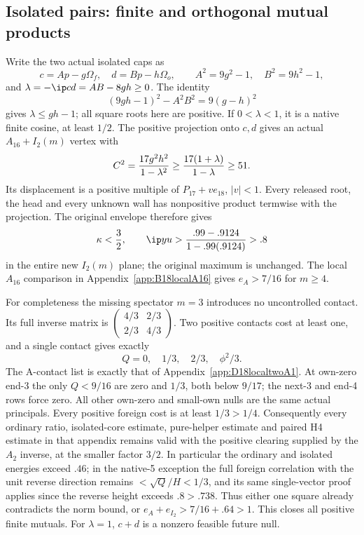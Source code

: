 \subsection{Isolated pairs: finite and orthogonal mutual products}
\label{app:D18isolatedfinite}

Write the two actual isolated caps as
\[
 c=Ap-g\Omega_f,\quad d=Bp-h\Omega_o,\qquad
 A^2=9g^2-1,\quad B^2=9h^2-1,
\]
and \(\lambda=-\ip cd=AB-8gh\ge0\).
The identity
\[
 (9gh-1)^2-A^2B^2=9(g-h)^2
\]
gives \(\lambda\le gh-1\); all square roots here are positive.
If \(0<\lambda<1\), it is a native finite cosine, at least \(1/2\).
The positive projection onto \(c,d\) gives an actual
\(A_{16}+I_2(m)\) vertex with
\[
 C^2={17g^2h^2\over1-\lambda^2}
 \ge {17(1+\lambda)\over1-\lambda}\ge51.
\]
Its displacement is a positive multiple of
\(P_{17}+ve_{18}\), \(|v|<1\).
Every released root, the head and every unknown wall has
nonpositive product termwise with the projection.
The original envelope therefore gives
\[
 \kappa<{3\over2},\qquad
 \ip yu>{.99-.9124\over1-.99(.9124)}>.8
\]
in the entire new \(I_2(m)\) plane; the original maximum is
unchanged.  The local \(A_{16}\) comparison in
Appendix~\ref{app:B18localA16} gives \(e_A>7/16\) for \(m\ge4\).

For completeness the missing spectator \(m=3\) introduces no
uncontrolled contact.  Its full inverse matrix is
\(\left(\begin{smallmatrix}4/3&2/3\\2/3&4/3\end{smallmatrix}\right)\).
Two positive contacts cost at least one, and a single contact gives
exactly
\[
                  Q=0,\quad1/3,\quad2/3,\quad\phi^2/3 .
\]
The A-contact list is exactly that of
Appendix~\ref{app:D18localtwoA1}.
At own-zero end-3 the only \(Q<9/16\) are zero and \(1/3\),
both below \(9/17\); the next-3 and end-4 rows force zero.
All other own-zero and small-own nulls are the same actual principals.
Every positive foreign cost is at least \(1/3>1/4\).
Consequently every ordinary ratio, isolated-core estimate,
pure-helper estimate and paired H4 estimate in that appendix
remains valid with the positive clearing supplied by the
\(A_2\) inverse, at the smaller factor \(3/2\).
In particular the ordinary and isolated energies exceed \(.46\);
in the native-5 exception the full foreign correlation with the
unit reverse direction remains \(<\sqrt Q/H<1/3\),
and its same single-vector proof applies since the reverse height
exceeds \(.8>.738\).
Thus either one square already contradicts the norm bound, or
\(e_A+e_{I_2}>7/16+.64>1\).
This closes all positive finite mutuals.
For \(\lambda=1\), \(c+d\) is a nonzero feasible future null.

